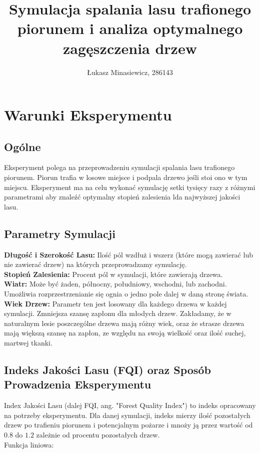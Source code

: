 \documentclass{article}
\title{Symulacja spalania lasu trafionego piorunem i analiza optymalnego zagęszczenia drzew}
\author{Łukasz Minasiewicz, 286143}
\begin{document}
\maketitle
\section{Warunki Eksperymentu}
\subsection{Ogólne}
Eksperyment polega na przeprowadzeniu symulacji spalania lasu trafionego piorunem. Piorun trafia w losowe miejsce i podpala drzewo jeśli stoi ono w tym miejscu. Eksperyment ma na celu wykonać symulację setki tysięcy razy z różnymi parametrami aby znaleźć optymalny stopień zalesienia lda najwyższej jakości lasu.\\

\subsection{Parametry Symulacji}
\textbf{Długość i Szerokość Lasu:} Ilość pól wzdłuż i wszerz (które mogą zawierać lub nie zawierać drzew) na których przeprowadzamy symulację.\vspace{1ex}\\
\textbf{Stopień Zalesienia:} Procent pól w symulacji, które zawierają drzewa.\vspace{1ex}\\
\textbf{Wiatr:} Może być żaden, północny, południowy, wschodni, lub zachodni. Umożliwia rozprzestrzenianie się ognia o jedno pole dalej w daną stronę świata.\vspace{1ex}\\
\textbf{Wiek Drzew:} Parametr ten jest losowany dla każdego drzewa w każdej symulacji. Zmniejsza szansę zapłonu dla młodych drzew. Zakładamy, że w naturalnym lesie poszczególne drzewa mają różny wiek, oraz że strasze drzewa mają większą szansę na zapłon, ze względu na swoją wielkość oraz ilość suchej, martwej tkanki.\\

\subsection{Indeks Jakości Lasu (FQI) oraz Sposób Prowadzenia Eksperymentu}
Index Jakości Lasu (dalej FQI, ang. "Forest Quality Index") to indeks opracowany na potrzeby eksperymentu. Dla danej symulacji, indeks mierzy ilość pozostałych drzew po trafieniu piorunem i potencjalnym pożarze i mnoży ją przez wartość od $0.8$ do $1.2$ zależnie od procentu pozostałych drzew.\vspace{1ex}\\
Funkcja liniowa:
\end{document}
